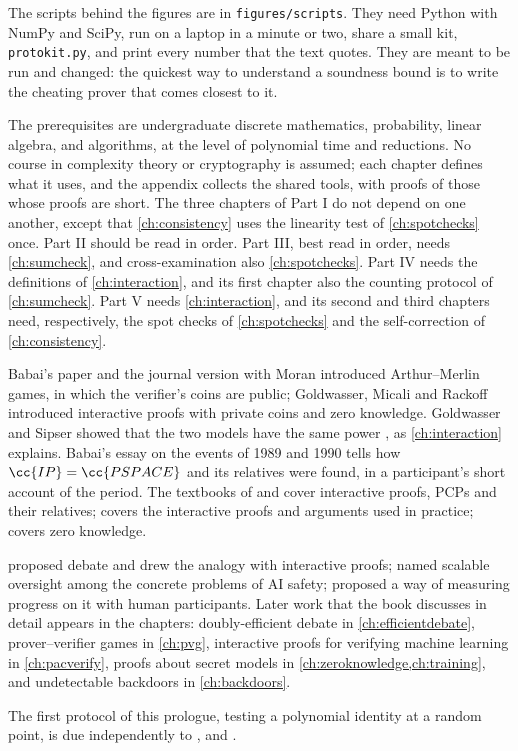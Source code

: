 \begin{refsection}
The scripts behind the figures are in \texttt{figures/scripts}. They need Python with NumPy and SciPy, run on a laptop in a minute or two, share a small kit, \texttt{protokit.py}, and print every number that the text quotes. They are meant to be run and changed: the quickest way to understand a soundness bound is to write the cheating prover that comes closest to it.

The prerequisites are undergraduate discrete mathematics, probability, linear algebra, and algorithms, at the level of polynomial time and reductions. No course in complexity theory or cryptography is assumed; each chapter defines what it uses, and the appendix collects the shared tools, with proofs of those whose proofs are short. The three chapters of Part I do not depend on one another, except that \cref{ch:consistency} uses the linearity test of \cref{ch:spotchecks} once. Part II should be read in order. Part III, best read in order, needs \cref{ch:sumcheck}, and cross-examination also \cref{ch:spotchecks}. Part IV needs the definitions of \cref{ch:interaction}, and its first chapter also the counting protocol of \cref{ch:sumcheck}. Part V needs \cref{ch:interaction}, and its second and third chapters need, respectively, the spot checks of \cref{ch:spotchecks} and the self-correction of \cref{ch:consistency}.

\notesandrefs

Babai's paper \parencite{Babai1985} and the journal version with Moran \parencite{BabaiMoran1988} introduced Arthur–Merlin games, in which the verifier's coins are public; Goldwasser, Micali and Rackoff \parencite{GoldwasserMicaliRackoff1989} introduced interactive proofs with private coins and zero knowledge. Goldwasser and Sipser showed that the two models have the same power \parencite{GoldwasserSipser1986}, as \cref{ch:interaction} explains. Babai's essay on the events of 1989 and 1990 \parencite{Babai1990} tells how $\cc{IP}=\cc{PSPACE}$ and its relatives were found, in a participant's short account of the period. The textbooks of \textcite{AroraBarak2009} and \textcite{Goldreich2008} cover interactive proofs, PCPs and their relatives; \textcite{Thaler2022} covers the interactive proofs and arguments used in practice; \textcite{Goldreich2001} covers zero knowledge.

\Textcite{IrvingEtAl2018} proposed debate and drew the analogy with interactive proofs; \textcite{AmodeiEtAl2016} named scalable oversight among the concrete problems of AI safety; \textcite{BowmanEtAl2022} proposed a way of measuring progress on it with human participants. Later work that the book discusses in detail appears in the chapters: doubly-efficient debate in \cref{ch:efficientdebate}, prover–verifier games in \cref{ch:pvg}, interactive proofs for verifying machine learning in \cref{ch:pacverify}, proofs about secret models in \cref{ch:zeroknowledge,ch:training}, and undetectable backdoors in \cref{ch:backdoors}.

The first protocol of this prologue, testing a polynomial identity at a random point, is due independently to \textcite{DeMilloLipton1978}, \textcite{Zippel1979} and \textcite{Schwartz1980}.

\printchapterbib
\end{refsection}
\vifloatrestore
